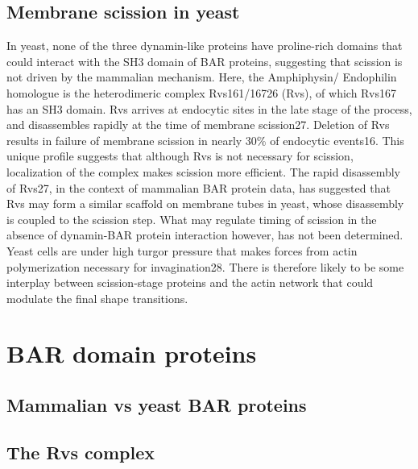 	\subsection{Membrane scission in yeast}
In yeast, none of the three dynamin-like proteins have proline-rich domains that could interact with the SH3 domain of BAR proteins, suggesting that scission is not driven by the mammalian mechanism. Here, the Amphiphysin/ Endophilin homologue is the heterodimeric complex Rvs161/16726 (Rvs), of which Rvs167 has an SH3 domain. Rvs arrives at endocytic sites in the late stage of the process, and disassembles rapidly at the time of membrane scission27. Deletion of Rvs results in failure of membrane scission in nearly 30\% of endocytic events16. This unique profile suggests that although Rvs is not necessary for scission, localization of the complex makes scission more efficient. The rapid disassembly of Rvs27, in the context of mammalian BAR protein data, has suggested that Rvs may form a similar scaffold on membrane tubes in yeast, whose disassembly is coupled to the scission step. What may regulate timing of scission in the absence of dynamin-BAR protein interaction however, has not been determined. Yeast cells are under high turgor pressure that makes forces from actin polymerization necessary for invagination28. There is therefore likely to be some interplay between scission-stage proteins and the actin network that could modulate the final shape transitions. 
	
		
	\section{BAR domain proteins}
		\subsection{Mammalian vs yeast BAR proteins}
		\subsection{The Rvs complex}		
		
		
	
